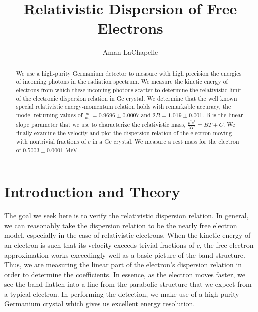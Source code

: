 \documentclass[reprint, nobibnotes, amssymb, amsmath, amsfonts, physics, mathtools, mathrsfs, floatfix]{revtex4-1}
\begin{document}
  \title{Relativistic Dispersion of Free Electrons}

  \author{Aman LaChapelle}


  \begin{abstract}
    We use a high-purity Germanium detector to measure with high precision the energies of incoming photons in the radiation spectrum.  We measure the kinetic energy of electrons from which these incoming photons scatter to determine the relativistic limit of the electronic dispersion relation in Ge crystal.  We determine that the well known special relativistic energy-momentum relation holds with remarkable accuracy, the model returning values of $\frac{m}{m_e} = 0.9696 \pm 0.0007$ and $2B = 1.019 \pm 0.001$.  B is the linear slope parameter that we use to characterize the relativistic mass, $\frac{p^2c^2}{2T} = BT + C$.  We finally examine the velocity and plot the dispersion relation of the electron moving with nontrivial fractions of $c$ in a Ge crystal.  We measure a rest mass for the electron of $0.5003\pm0.0001$ MeV.
  \end{abstract}

  \maketitle
  \tableofcontents

  \section{Introduction and Theory}
    The goal we seek here is to verify the relativistic dispersion relation.  In general, we can reasonably take the dispersion relation to be the nearly free electron model, especially in the case of relativistic electrons.  When the kinetic energy of an electron is such that its velocity exceeds trivial fractions of $c$, the free electron approximation works exceedingly well as a basic picture of the band structure.  Thus, we are measuring the linear part of the electron's dispersion relation in order to determine the coefficients.  In essence, as the electron moves faster, we see the band flatten into a line from the parabolic structure that we expect from a typical electron.  In performing the detection, we make use of a high-purity Germanium crystal which gives us excellent energy resolution.

    \hspace{.25cm}
\end{document}
